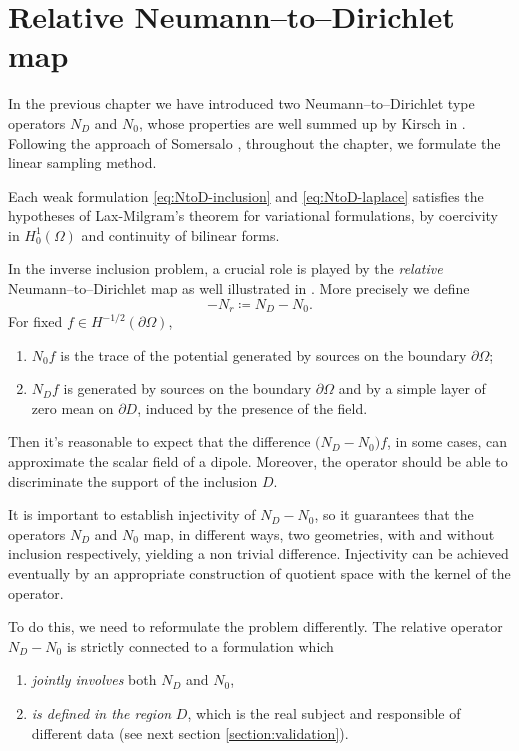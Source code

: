 \documentclass[10pt, a4paper, twoside, openright]{book}
\theoremstyle{definition}
\theoremstyle{plain}
\theoremstyle{plain}
\theoremstyle{plain}
\theoremstyle{plain}
\theoremstyle{plain}
\theoremstyle{plain}
\theoremstyle{plain}
\theoremstyle{plain}
\begin{document}
\section{Relative Neumann--to--Dirichlet map}
In the previous chapter we have introduced two Neumann--to--Dirichlet type operators ${N_D}$ and ${N_0}$, 
whose properties are well summed up by Kirsch in \cite{kirsch:book}. 
Following the approach of Somersalo \cite{somersalo:preprint}, throughout the chapter, 
we formulate the linear sampling method.
\par
Each weak formulation \eqref{eq:NtoD-inclusion} and \eqref{eq:NtoD-laplace} satisfies the hypotheses of Lax-Milgram's theorem for 
variational formulations, by coercivity in $H^1_0(\Omega)$ and continuity of bilinear forms. 
\par
In the inverse inclusion problem, a crucial role is played by the 
\textit{relative} Neumann--to--Dirichlet map as well illustrated in \cite{somersalo:preprint}. More precisely we define 
\begin{equation}
 -{N_r} \coloneqq {N_D} - {N_0}.
\end{equation}
For fixed $f\in  H^{-1/2}(\partial \Omega)$,
\begin{enumerate}
 \item ${N_0} f$ is the trace of the potential generated by sources on the boundary $\partial \Omega$;
 \item ${N_D} f$ is generated by sources on the boundary $\partial \Omega$ and by a simple layer of 
 zero mean on $\partial D$, induced by the presence of the field.
\end{enumerate}
Then it's reasonable to expect that the difference $\bigl({N_D}-{N_0}\bigr)f$, in some cases, 
can approximate the scalar field of a dipole.
Moreover, the operator should be able to discriminate the support of the inclusion $D$.
\par
It is important to establish injectivity of ${N_D} - {N_0}$, so it guarantees that the operators 
${N_D}$ and ${N_0}$ map, in different ways, two geometries, with and without inclusion respectively, 
yielding a non trivial difference.
Injectivity can be achieved eventually by an appropriate construction of quotient space with the kernel of the operator.
\par
To do this, we need to reformulate the problem differently.
The relative operator ${N_D} - {N_0}$ is strictly connected to a formulation which
\begin{enumerate}
 \item \emph{jointly involves} both ${N_D}$ and ${N_0}$,
 \item \emph{is defined in the region} $D$, which is the real subject and responsible of different data  
 (see next section \ref{section:validation}).
\end{enumerate}
\end{document}
